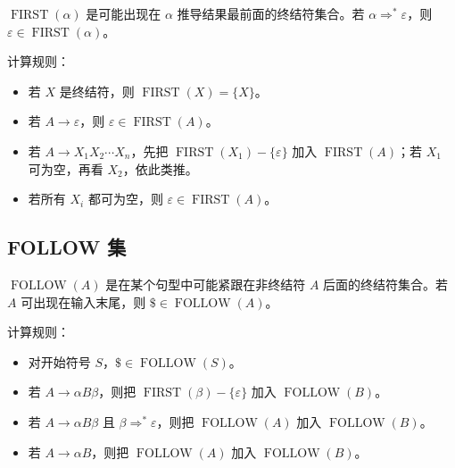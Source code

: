 \documentclass[UTF8,fontset=none,11pt]{ctexart}
\newenvironment{defbox}[1][]{%
  \par\medskip\noindent{\color{defrule}\rule{\linewidth}{1.1pt}}\par\nopagebreak
  \noindent{\bfseries\color{defrule}#1}\par\nopagebreak\smallskip}%
  {\par\nopagebreak\smallskip\noindent{\color{defrule}\rule{\linewidth}{0.4pt}}\par\medskip}
\newcommand{\eps}{\varepsilon}
\newcommand{\FIRST}{\operatorname{FIRST}}
\newcommand{\FOLLOW}{\operatorname{FOLLOW}}
\begin{document}
\begin{defbox}[FIRST]
\(\FIRST(\alpha)\) 是可能出现在 \(\alpha\) 推导结果最前面的终结符集合。若 \(\alpha\Rightarrow^*\eps\)，则 \(\eps\in\FIRST(\alpha)\)。
\end{defbox}

计算规则：

\begin{itemize}
  \item 若 \(X\) 是终结符，则 \(\FIRST(X)=\{X\}\)。
  \item 若 \(A\to\eps\)，则 \(\eps\in\FIRST(A)\)。
  \item 若 \(A\to X_1X_2\cdots X_n\)，先把 \(\FIRST(X_1)-\{\eps\}\) 加入 \(\FIRST(A)\)；若 \(X_1\) 可为空，再看 \(X_2\)，依此类推。
  \item 若所有 \(X_i\) 都可为空，则 \(\eps\in\FIRST(A)\)。
\end{itemize}

\subsection{FOLLOW 集}

\begin{defbox}[FOLLOW]
\(\FOLLOW(A)\) 是在某个句型中可能紧跟在非终结符 \(A\) 后面的终结符集合。若 \(A\) 可出现在输入末尾，则 \(\$\in\FOLLOW(A)\)。
\end{defbox}

计算规则：

\begin{itemize}
  \item 对开始符号 \(S\)，\(\$\in\FOLLOW(S)\)。
  \item 若 \(A\to\alpha B\beta\)，则把 \(\FIRST(\beta)-\{\eps\}\) 加入 \(\FOLLOW(B)\)。
  \item 若 \(A\to\alpha B\beta\) 且 \(\beta\Rightarrow^*\eps\)，则把 \(\FOLLOW(A)\) 加入 \(\FOLLOW(B)\)。
  \item 若 \(A\to\alpha B\)，则把 \(\FOLLOW(A)\) 加入 \(\FOLLOW(B)\)。
\end{itemize}

\begin{center}
\end{center}
\end{document}
